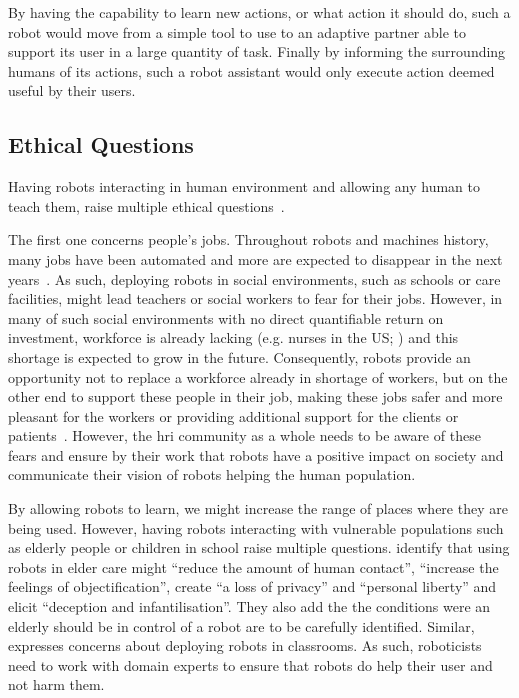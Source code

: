 By having the capability to learn new actions, or what action it should do, such a robot would move from a simple tool to use to an adaptive partner able to support its user in a large quantity of task. Finally by informing the surrounding humans of its actions, such a robot assistant would only execute action deemed useful by their users.

\subsection{Ethical Questions} \label{sec:disc_ethics}
Having robots interacting in human environment and allowing any human to teach them, raise multiple ethical questions~\cite{lin2014robot}.

The first one concerns people's jobs. Throughout robots and machines history, many jobs have been automated and more are expected to disappear in the next years~\citep{frey2017future}. As such, deploying robots in social environments, such as schools or care facilities, might lead teachers or social workers to fear for their jobs. However, in many of such social environments with no direct quantifiable return on investment, workforce is already lacking (e.g. nurses in the US; \citealt{nevidjon2001nursing}) and this shortage is expected to grow in the future. Consequently, robots provide an opportunity not to replace a workforce already in shortage of workers, but on the other end to support these people in their job, making these jobs safer and more pleasant for the workers or providing additional support for the clients or patients~\citep{wada2005psychological}. However, the \gls{hri} community as a whole needs to be aware of these fears and ensure by their work that robots have a positive impact on society and communicate their vision of robots helping the human population.

By allowing robots to learn, we might increase the range of places where they are being used. However, having robots interacting with vulnerable populations such as elderly people or children in school raise multiple questions. \cite{sharkey2012granny} identify that using robots in elder care might ``reduce the amount of human contact'', ``increase the feelings of objectification'', create ``a loss of privacy'' and ``personal liberty'' and elicit ``deception and infantilisation''. They also add the the conditions were an elderly should be in control of a robot are to be carefully identified. Similar, \cite{sharkey2016should} expresses concerns about deploying robots in classrooms. As such, roboticists need to work with domain experts to ensure that robots do help their user and not harm them.

